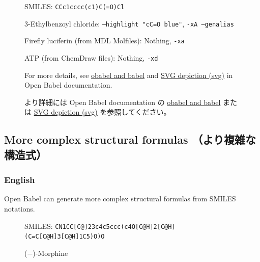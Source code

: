 \documentclass[12pt]{jsarticle}
\begin{document}
\begin{figure}[ht]
  \centering
  \caption{3-Ethylbenzoyl chloride: \texttt{--highlight "cC=O blue"}, \texttt{-xA --genalias}}
  SMILES: \verb|CCc1cccc(c1)C(=O)Cl|
\end{figure}

\begin{figure}[ht]
  \centering
  \caption{Firefly luciferin (from MDL Molfiles): Nothing, \texttt{-xa}}
\end{figure}

\begin{figure}[ht]
  \centering
  \caption{ATP (from ChemDraw files): Nothing, \texttt{-xd}}
\end{figure}

\begin{figure}[ht]
For more details, see \href{http://openbabel.org/docs/dev/Command-line_tools/babel.html}{obabel and babel} and \href{http://openbabel.org/docs/dev/FileFormats/SVG_2D_depiction.html}{SVG depiction (svg)} in Open Babel documentation.

より詳細には Open Babel documentation の \href{http://openbabel.org/docs/dev/Command-line_tools/babel.html}{obabel and babel} または \href{http://openbabel.org/docs/dev/FileFormats/SVG_2D_depiction.html}{SVG depiction (svg)} を参照してください。
\end{figure}

\clearpage

\subsection{More complex structural formulas （より複雑な構造式）}

\subsubsection{English}

Open Babel can generate more complex structural formulas from SMILES notations.

\begin{figure}[ht]
  \centering
  \caption{($-$)-Morphine}
  SMILES: \verb|CN1CC[C@]23c4c5ccc(c4O[C@H]2[C@H](C=C[C@H]3[C@H]1C5)O)O|
\end{figure}
\end{document}
